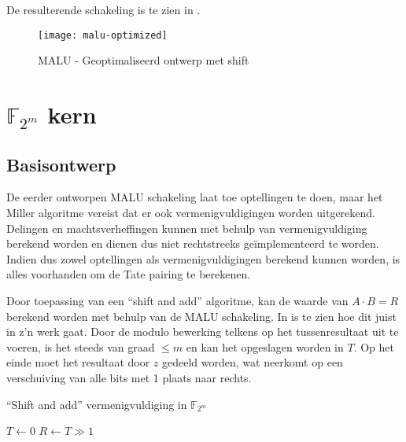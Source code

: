 De resulterende schakeling is te zien in .

\begin{figure}[h]
	\centering
		\texttt{[image: malu-optimized]}
		\caption{MALU - Geoptimaliseerd ontwerp met shift\label{figuur-implementatie-malu-optimized}}
\end{figure}

\section{$\mathbb{F}_{2^m}$\label{sectie-implementatie-gf2m} kern}

\subsection{Basisontwerp\label{subsectie-implementatie-gf2m-basisontwerp}}

De eerder ontworpen MALU schakeling laat toe optellingen te doen, maar het Miller algoritme vereist dat er ook vermenigvuldigingen worden uitgerekend. Delingen en machtsverheffingen kunnen met behulp van vermenigvuldiging berekend worden en dienen dus niet rechtstreeks ge\"implementeerd te worden. Indien dus zowel optellingen als vermenigvuldigingen berekend kunnen worden, is alles voorhanden om de Tate pairing te berekenen.

Door toepassing van een ``shift and add'' algoritme, kan de waarde van \mbox{$A \cdot B = R$} berekend worden met behulp van de MALU schakeling. In  is te zien hoe dit juist in z'n werk gaat. Door de modulo bewerking telkens op het tussenresultaat uit te voeren, is het steeds van graad $\leq m$ en kan het opgeslagen worden in $T$. Op het einde moet het resultaat door $z$ gedeeld worden, wat neerkomt op een verschuiving van alle bits met 1 plaats naar rechts.

\begin{algorithm}[h]
	\caption{``Shift and add'' vermenigvuldiging in $\mathbb{F}_{2^m}$}
	\label{algoritme-implementatie-gf2m-multiply}

	$T \leftarrow 0$\;
	$R \leftarrow T \gg 1$\;
\end{algorithm}

